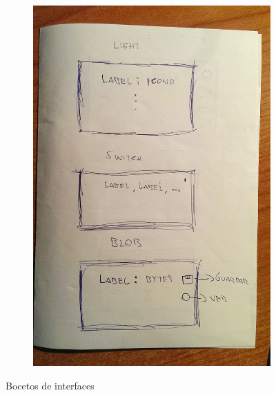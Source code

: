 \begin{figure}
\begin{subfigure}[]{0.45\textwidth}
        \caption{}
        \label{fig:boceto}
    \end{subfigure}
    \begin{subfigure}[]{0.45\textwidth}
        \includegraphics[width=\textwidth]{../images/boceto2.jpg}
        \caption{}
        \label{fig:boceto_2}
    \end{subfigure}
    \caption{Bocetos de interfaces}\label{fig:bocetos}
\end{figure}

